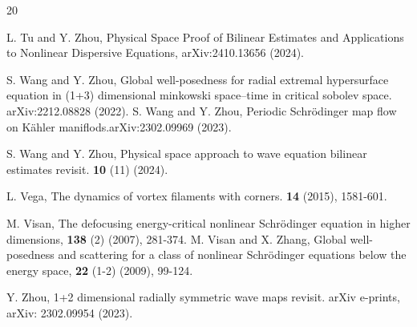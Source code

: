 \documentclass[11pt,letterpaper,reqno]{amsart}
\numberwithin{equation}{section}
\theoremstyle{definition}
\theoremstyle{remark}
\begin{document}
\begin{thebibliography}{20}
	
L.	Tu  and Y. Zhou,
	Physical Space Proof of Bilinear Estimates and Applications to Nonlinear Dispersive Equations,
	arXiv:2410.13656 (2024).
	
S.	Wang and Y. Zhou, Global well-posedness for radial extremal hypersurface equation in (1+3)
	dimensional minkowski space--time in critical sobolev space. arXiv:2212.08828 (2022).
	S. Wang and Y. Zhou, Periodic Schr\"odinger map flow on Kähler maniflods.arXiv:2302.09969 (2023).
	
	S. Wang and Y. Zhou, Physical space approach to wave equation bilinear estimates revisit.  \textbf{10}  (11) (2024).  
	
	
L.	Vega,  The dynamics of vortex filaments with corners.   \textbf{14} (2015),
	1581-601.
	
	M. Visan, The defocusing energy-critical nonlinear Schr\"odinger equation in higher
	dimensions,  \textbf{138} (2) (2007), 281-374.
	M. Visan and X. Zhang, Global well-posedness and scattering for a class of nonlinear
	Schr\"odinger equations below the energy space,  \textbf{22} (1-2)
	(2009), 99-124.
	
	
	 Y. Zhou, 1+2 dimensional radially symmetric wave maps revisit. arXiv e-prints,  arXiv: 2302.09954 (2023).

	
	
	
	
	
\end{thebibliography}
\end{document}
